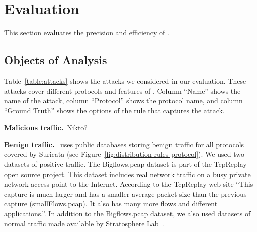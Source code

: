 \documentclass[sigconf,review, anonymous]{acmart}
\begin{document}




\section{Evaluation}

This section evaluates the precision and efficiency of \tname{}.

\subsection{Objects of Analysis}
\label{sec:dataset-benign}

Table~\ref{table:attacks} shows the attacks we considered in our
evaluation. These attacks cover different protocols and features of
\tname{}. Column ``Name'' shows the name of the attack, column
``Protocol'' shows the protocol name, and column ``Ground Truth''
shows the options of the rule that captures the attack.

\vspace{1ex}
\noindent
\textbf{Malicious traffic.}~Nikto?

\vspace{1ex}
\noindent
\textbf{Benign traffic.}~\tname{} uses public databases storing benign
traffic for all protocols covered by Suricata (see
Figure~\ref{fig:distribution-rules-protocol}). We used two datasets of
positive traffic. The Bigflows.pcap dataset is part of the
TcpReplay~\cite{tcpreplay} open source project. This dataset includes
real network traffic on a busy private network access point to the
Internet. According to the TcpReplay web site ``This capture is much
larger and has a smaller average packet size than the previous capture
(smallFlows.pcap). It also has many more flows and different
applications.''. In addition to the Bigflows.pcap dataset, we also
used datasets of normal traffic made available by Stratosphere
Lab~\cite{stratosphere-normal}.
\end{document}
